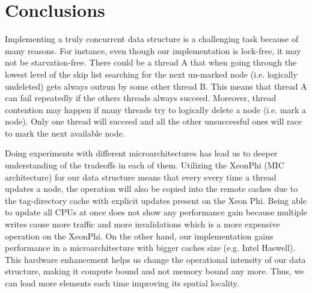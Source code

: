 \section{Conclusions}
\label{sec:con}

Implementing a truly concurrent data structure is a challenging task because of many reasons. For instance, even though our implementation is lock-free, it may not be starvation-free. There could be a thread A that when going through the lowest level of the skip list searching for the next un-marked node (i.e. logically undeleted) gets always outrun by some other thread B. This means that thread A can fail repeatedly if the others threads always succeed. Moreover, thread contention may happen if many threads try to logically delete a node (i.e. mark a node). Only one thread will succeed and all the other unsuccessful ones will race to mark 
the next available node. 

Doing experiments with different microarchitectures has lead us to deeper understanding of the tradeoffs in each of them. Utilizing the XeonPhi (MIC architecture) for our data structure means that every every time a thread updates a node, the operation will also be copied 
into the remote caches due to the tag-directory cache with explicit updates present on the Xeon Phi. Being able to update all CPUs at once does not show any performance gain because multiple writes cause more traffic and more invalidations which is a more expensive operation on the XeonPhi. On the other hand, our implementation gains performance in a microarchitecture with bigger caches size (e.g. Intel Haswell). This hardware enhancement helps us change the operational intensity of our data structure, making it compute bound and not memory bound any more. Thus, we can load more elements each time improving its spatial locality.